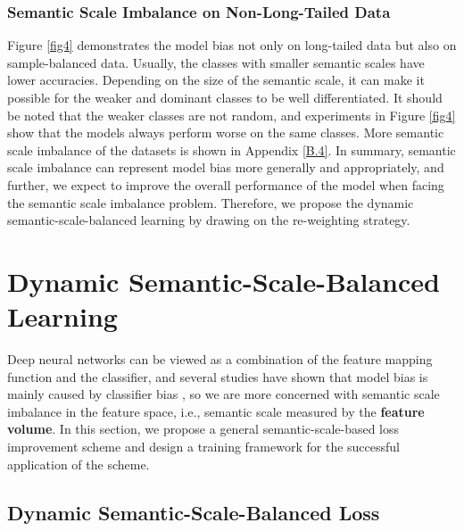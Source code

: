 \documentclass[10pt]{article} %
\begin{document}
\subsubsection{Semantic Scale Imbalance on Non-Long-Tailed Data}


Figure \ref{fig4} demonstrates the model bias not only on long-tailed data but also on sample-balanced data. Usually, the classes with smaller semantic scales have lower accuracies. Depending on the size of the semantic scale, it can make it possible for the weaker and dominant classes to be well differentiated. It should be noted that the weaker classes are not random, and experiments in Figure \ref{fig4} show that the models always perform worse on the same classes. More semantic scale imbalance of the datasets is shown in Appendix \ref{B.4}. In summary, semantic scale imbalance can represent model bias more generally and appropriately, and further, we expect to improve the overall performance of the model when facing the semantic scale imbalance problem. Therefore, we propose the dynamic semantic-scale-balanced learning by drawing on the re-weighting strategy.



\section{Dynamic Semantic-Scale-Balanced Learning\label{4}}
Deep neural networks can be viewed as a combination of the feature mapping function and the classifier, and several studies have shown that model bias is mainly caused by classifier bias \cite{paper10,paper11,paper75}, so we are more concerned with semantic scale imbalance in the feature space, i.e., semantic scale measured by the \textbf{feature volume}. In this section, we propose a general semantic-scale-based loss improvement scheme and design a training framework for the successful application of the scheme.


\subsection{Dynamic Semantic-Scale-Balanced Loss\label{4.1}}
\end{document}
